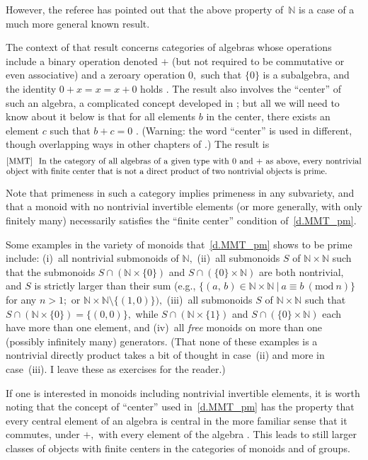 \documentclass{amsart}
\numberwithin{equation}{section}
\numberwithin{theorem}{section}
\newcommand{\N}{\mathbb{N}}
\begin{document}
However, the referee has pointed out that the above property
of~$\N$ is a case of a much more general known result.

The context of that result concerns categories of algebras
whose operations include a binary operation denoted $+$
(but not required to be commutative or even associative) and
a zeroary operation $0,$ such that $\{0\}$ is a subalgebra,
and the identity $0+x=x=x+0$ holds \cite[start of \S5.4]{MMT}.
The result also involves the ``center'' of
such an algebra, a complicated concept developed
in \cite[\S5.5]{MMT}; but all we will need to know about it below is
that for all elements $b$ in the center, there exists an element
$c$ such that $b+c=0$ \cite[Definitions~5.11 and 5.12]{MMT}.
(Warning: the word ``center'' is used in different,
though overlapping ways in other chapters of \cite{MMT}.)
The result is
%
\begin{equation}\begin{minipage}[c]{35pc}\label{d.MMT_pm}
\cite[Exercise~5.15\,(10), p.\,300]{MMT} \ %
In the category of all algebras of a given type with $0$ and $+$
as above, every nontrivial object with finite center that is
not a direct product of two nontrivial objects is prime.
\end{minipage}\end{equation}

Note that primeness in such a category implies primeness
in any subvariety, and that a monoid with no nontrivial
invertible elements (or more generally, with only finitely
many) necessarily satisfies the ``finite center''
condition of~\eqref{d.MMT_pm}.

Some examples in the variety of monoids that~\eqref{d.MMT_pm}
shows to be prime include: (i)~all nontrivial
submonoids of $\N,$ (ii)~all submonoids $S$ of $\N\times\N$
such that the submonoids $S\cap(\N\times\{0\})$ and
$S\cap(\{0\}\times\N)$ are both nontrivial, and $S$ is strictly
larger than their sum (e.g., $\{(a,\,b)\in\N\times\N\ |
\ a\equiv b\ (\mathrm{mod}~n)\}$ for any $n>1;$
or $\N\times\N\setminus\{(1,0)\}),$
(iii)~all submonoids $S$ of $\N\times\N$ such that
$S\cap(\N\times\{0\})=\{(0,0)\},$ while
$S\cap(\N\times\{1\})$ and $S\cap(\{0\}\times\N)$ each have more
than one element, and (iv)~all {\em free} monoids
on more than one (possibly infinitely many) generators.
(That none of these examples is a nontrivial directly product takes
a bit of thought in case~(ii) and more in case~(iii).
I leave these as exercises for the reader.)

If one is interested in monoids including nontrivial invertible
elements, it is worth noting that the concept of ``center''
used in~\eqref{d.MMT_pm} has the property that every central
element of an algebra is central in the more familiar sense
that it commutes, under $+,$ with every element of the algebra
\cite[p.\,296, sentence containing first display]{MMT}.
This leads to still larger classes of objects with
finite centers in the categories of monoids and of groups.
\end{document}
